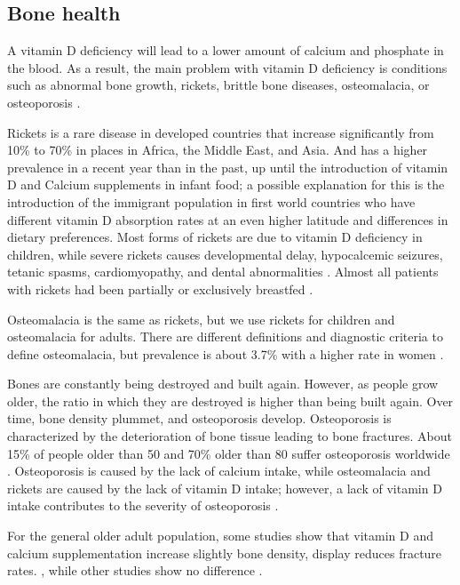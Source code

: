 \subsection{Bone health}

A vitamin D deficiency will lead to a lower amount of calcium and phosphate in the blood. As a result, the main problem with vitamin D deficiency is conditions such as abnormal bone growth, rickets, brittle bone diseases, osteomalacia, or osteoporosis \cite{ref:Elder2014}.

Rickets is a rare disease in developed countries that increase significantly from 10\% to 70\% in places in Africa, the Middle East, and Asia.\cite{ref:ricketstats} And has a higher prevalence in a recent year than in the past, up until the introduction of vitamin D and Calcium supplements in infant food\cite{ref:ricketstats, ref:Uday2017, ref:Munns2016}; a possible explanation for this is the introduction of the immigrant population in first world countries who have different vitamin D absorption rates at an even higher latitude and differences in dietary preferences. Most forms of rickets are due to vitamin D deficiency in children, while severe rickets causes developmental delay, hypocalcemic seizures, tetanic spasms, cardiomyopathy, and dental abnormalities \cite{ref:Uday2017, ref:Munns2016}. Almost all patients with rickets had been partially or exclusively breastfed \cite{ref:Uday2017, ref:Thacher2013}.

Osteomalacia is the same as rickets, but we use rickets for children and osteomalacia for adults. There are different definitions and diagnostic criteria to define osteomalacia, but prevalence is about 3.7\% with a higher rate in women \cite{ref:CAMPBELL1984}.

Bones are constantly being destroyed and built again. However, as people grow older, the ratio in which they are destroyed is higher than being built again. Over time, bone density plummet, and osteoporosis develop. Osteoporosis is characterized by the deterioration of bone tissue leading to bone fractures. About 15\% of people older than 50 and 70\% older than 80 suffer osteoporosis worldwide \cite{ref:osteoporisisstats}. Osteoporosis is caused by the lack of calcium intake, while osteomalacia and rickets are caused by the lack of vitamin D intake; however, a lack of vitamin D intake contributes to the severity of osteoporosis \cite{ref:1_Institute_of_Medicine2011-zg}.

For the general older adult population, some studies show that vitamin D and calcium supplementation increase slightly bone density, display reduces fracture rates. \cite{ref:Chung2009-wl, ref:1_Institute_of_Medicine2011-zg, ref:Yao2019, ref:Bouillon2021}, while other studies show no difference \cite{ref:Kahwati2018, ref:AMADavid2018, ref:Gallagher2018, ref:Bolland2018, ref:AMAGrossman2018, ref:GuirguisBlake2018, ref:LeBoff2022, ref:Bouillon2021} . \vspace{3 mm}

